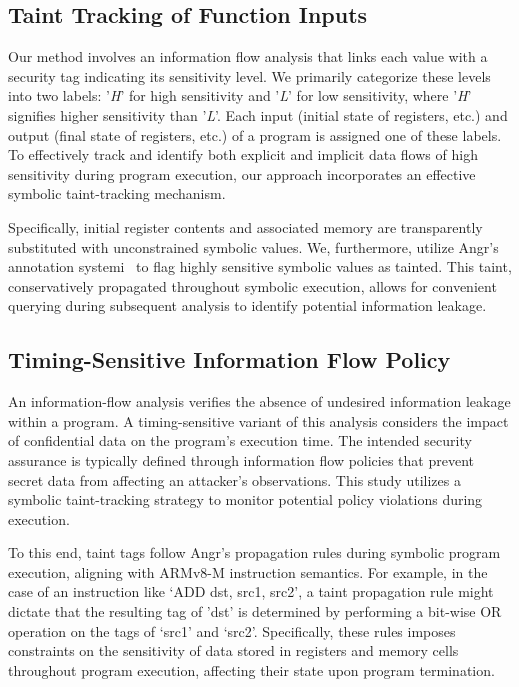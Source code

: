 \subsection{Taint Tracking of Function Inputs}

Our method involves an information flow analysis that links each value with
a security tag indicating its sensitivity level. We primarily categorize
these levels into two labels: '\textit{H}' for high sensitivity and
'\textit{L}' for low sensitivity, where '\textit{H}' signifies higher
sensitivity than '\textit{L}'. Each input (initial state of registers,
etc.) and output (final state of registers, etc.) of a program is assigned
one of these labels. To effectively track and identify both explicit and
implicit data flows of high sensitivity during program execution, our
approach incorporates an effective symbolic taint-tracking mechanism.

Specifically, initial register contents and associated memory are
transparently substituted with unconstrained symbolic values. We,
furthermore, utilize Angr’s annotation systemi~\cite{angr} to flag highly
sensitive symbolic values as tainted. This taint, conservatively propagated
throughout symbolic execution, allows for convenient querying during
subsequent analysis to identify potential information leakage. 

\subsection{Timing-Sensitive Information Flow Policy}

An information-flow analysis verifies the absence of undesired information
leakage within a program. A timing-sensitive variant of this analysis
considers the impact of confidential data on the program's execution time.
The intended security assurance is typically defined through information
flow policies that prevent secret data from affecting an attacker's
observations. This study utilizes a symbolic taint-tracking strategy to
monitor potential policy violations during execution.

To this end, taint tags follow Angr's propagation rules during symbolic
program execution, aligning with ARMv8-M instruction semantics. For
example, in the case of an instruction like ‘ADD dst, src1, src2’, a taint
propagation rule might dictate that the resulting tag of 'dst' is
determined by performing a bit-wise OR operation on the tags of ‘src1’ and
‘src2’. Specifically, these rules imposes constraints on the sensitivity of
data stored in registers and memory cells throughout program execution,
affecting their state upon program termination. 

